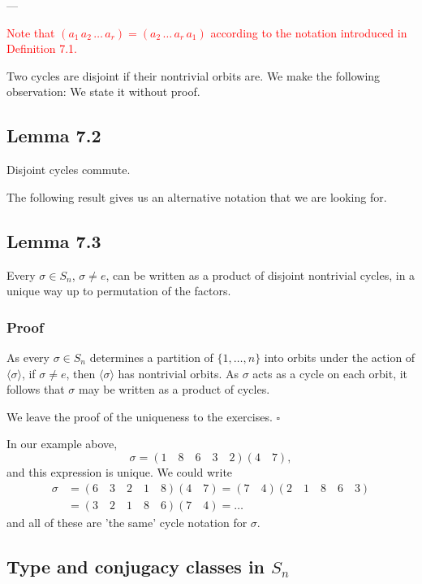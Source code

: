 ---

\textcolor{red}{Note that $(a_1 \, a_2 \, \dots \, a_r) = (a_2 \, \dots \, a_r \, a_1)$ according to the notation introduced in Definition 7.1.}

Two cycles are disjoint if their nontrivial orbits are. We make the following observation: We state it without proof.

\subsection*{Lemma 7.2}

Disjoint cycles commute.

The following result gives us an alternative notation that we are looking for.
\subsection*{Lemma 7.3}

Every $\sigma \in S_n$, $\sigma \neq e$, can be written as a product of disjoint nontrivial cycles, in a unique way up to permutation of the factors.

\subsubsection*{Proof}

As every $\sigma \in S_n$ determines a partition of $\{1, \dots, n\}$ into orbits under the action of $\langle \sigma \rangle$, if $\sigma \neq e$, then $\langle \sigma \rangle$ has nontrivial orbits. As $\sigma$ acts as a cycle on each orbit, it follows that $\sigma$ may be written as a product of cycles.

We leave the proof of the uniqueness to the exercises.
\hfill $\square$

\vspace{1em}
In our example above,
$$ \sigma = (1 \quad 8 \quad 6 \quad 3 \quad 2)(4 \quad 7), $$
and this expression is unique. We could write
\begin{align*}
\sigma &= (6 \quad 3 \quad 2 \quad 1 \quad 8)(4 \quad 7) = (7 \quad 4)(2 \quad 1 \quad 8 \quad 6 \quad 3) \\
&= (3 \quad 2 \quad 1 \quad 8 \quad 6)(7 \quad 4) = \dots
\end{align*}
and all of these are 'the same' cycle notation for $\sigma$.

\subsection*{Type and conjugacy classes in $S_n$}

